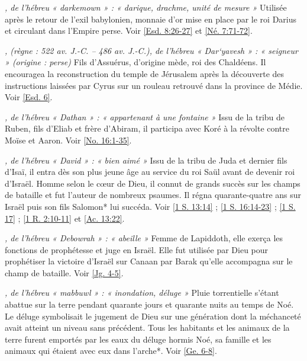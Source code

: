 \begin{multicols}{2}
\textit{, de l'hébreu « darkemown » : « darique, drachme, unité de mesure »}\newline
Utilisée après le retour de l'exil babylonien, monnaie d'or mise en place par le roi Darius et circulant dans l'Empire perse. Voir \vref{Esd. 8:26-27} et \vref{Né. 7:71-72}.

\textit{, (règne : 522 av. J.-C. – 486 av. J.-C.), de l'hébreu « Dar`yavesh » : « seigneur » (origine : perse)}\newline
Fils d'Assuérus, d'origine mède, roi des Chaldéens. Il encouragea la reconstruction du temple de Jérusalem après la découverte des instructions laissées par Cyrus sur un rouleau retrouvé dans la province de Médie. Voir \vref{Esd. 6}.

\textit{, de l'hébreu « Dathan » : « appartenant à une fontaine »}\newline
Issu de la tribu de Ruben, fils d'Eliab et frère d'Abiram, il participa avec Koré à la révolte contre Moïse et Aaron. Voir \vref{No. 16:1-35}.

\textit{, de l'hébreu « David » : « bien aimé »}\newline
Issu de la tribu de Juda et dernier fils d'Isaï, il entra dès son plus jeune âge au service du roi Saül avant de devenir roi d'Israël. Homme selon le cœur de Dieu, il connut de grands succès sur les champs de bataille et fut l'auteur de nombreux psaumes. Il régna quarante-quatre ans sur Israël puis son fils Salomon* lui succéda. Voir \vref{1 S. 13:14} ; \vref{1 S. 16:14-23} ; \vref{1 S. 17} ; \vref{1 R. 2:10-11} et \vref{Ac. 13:22}.

\textit{, de l'hébreu « Debowrah » : « abeille »}\newline
Femme de Lapiddoth, elle exerça les fonctions de prophétesse et juge en Israël. Elle fut utilisée par Dieu pour prophétiser la victoire d'Israël sur Canaan par Barak qu'elle accompagna sur le champ de bataille. Voir \vref{Jg. 4-5}.

\textit{, de l'hébreu « mabbuwl » : « inondation, déluge »}\newline
Pluie torrentielle s'étant abattue sur la terre pendant quarante jours et quarante nuits au temps de Noé. Le déluge symbolisait le jugement de Dieu sur une génération dont la méchanceté avait atteint un niveau sans précédent. Tous les habitants et les animaux de la terre furent emportés par les eaux du déluge hormis Noé, sa famille et les animaux qui étaient avec eux dans l'arche*. Voir \vref{Ge. 6-8}.


\end{multicols}
